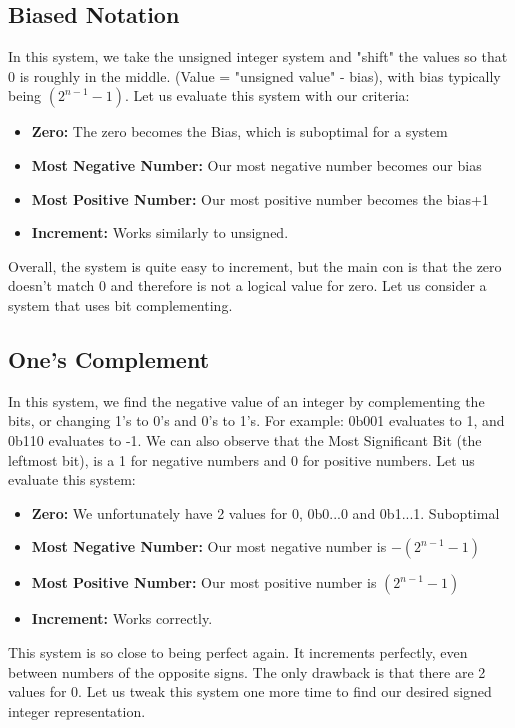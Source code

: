 \documentclass[letterpaper]{article}
\theoremstyle{remark}
\begin{document}
\subsection{Biased Notation}
In this system, we take the unsigned integer system and "shift" the values so that 0 is roughly in the middle. (Value = "unsigned value" - bias), with bias typically being $(2^{n-1} - 1)$. Let us evaluate this system with our criteria:
\begin{itemize}
    \item \textbf{Zero:} The zero becomes the Bias, which is suboptimal for a system
    \item \textbf{Most Negative Number:} Our most negative number becomes our bias
    \item \textbf{Most Positive Number:} Our most positive number becomes the bias+1
    \item \textbf{Increment:} Works similarly to unsigned. 
\end{itemize}
Overall, the system is quite easy to increment, but the main con is that the zero doesn't match 0 and therefore is not a logical value for zero. Let us consider a system that uses bit complementing.

\subsection{One's Complement}
In this system, we find the negative value of an integer by complementing the bits, or changing 1's to 0's and 0's to 1's. For example: 0b001 evaluates to 1, and 0b110 evaluates to -1. We can also observe that the Most Significant Bit (the leftmost bit), is a 1 for negative numbers and 0 for positive numbers. Let us evaluate this system:
\begin{itemize}
    \item \textbf{Zero:} We unfortunately have 2 values for 0, 0b0...0 and 0b1...1. Suboptimal
    \item \textbf{Most Negative Number:} Our most negative number is $-(2^{n-1} - 1)$
    \item \textbf{Most Positive Number:} Our most positive number is $(2^{n-1} - 1)$
    \item \textbf{Increment:} Works correctly.
\end{itemize}
This system is so close to being perfect again. It increments perfectly, even between numbers of the opposite signs. The only drawback is that  there are 2 values for 0. Let us tweak this system one more time to find our desired signed integer representation.
\end{document}

